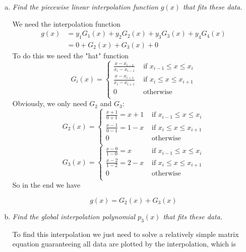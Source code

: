 \documentclass{article}
\begin{document}
\begin{enumerate}[(a)]
  \item \textit{Find the piecewise linear interpolation function $g(x)$ that fits these data.}

    We need the interpolation function
    \begin{align*}
      g(x) &= y_1G_1(x) + y_2G_2(x) + y_3G_3(x) + y_4G_4(x)\\
      &= 0 + G_2(x) + G_3(x) + 0
    \end{align*}
    To do this we need the "hat" function
    \[
      G_i(x) =
      \begin{cases}
        \frac{x-x_{i-1}}{x_i-x_{i-1}} &\text{ if } x_{i-1} \leq x \leq x_i \\
        \frac{x-x_{i+1}}{x_i - x_{i+1}} &\text{ if } x_i \leq x \leq x_{i+1} \\
        0 &\text{ otherwise } \\
      \end{cases}
    \]
    Obviously, we only need $G_2$ and $G_3$:
    \[
      G_2(x) =
      \begin{cases}
        \frac{x+1}{0 + 1} = x + 1&\text{ if } x_{i-1} \leq x \leq x_i \\
        \frac{x-1}{0 - 1} = 1 - x&\text{ if } x_i \leq x \leq x_{i+1} \\
        0 &\text{ otherwise } \\
      \end{cases}
    \]
    \[
      G_3(x) =
      \begin{cases}
        \frac{x-0}{1 - 0} = x &\text{ if } x_{i-1} \leq x \leq x_i \\
        \frac{x-2}{1 - 2} = 2 - x&\text{ if } x_i \leq x \leq x_{i+1} \\
        0 &\text{ otherwise } \\
      \end{cases}
    \]
    So in the end we have

    \[
      g(x) = G_2(x) + G_3(x)
    \]

        
  \item \textit{Find the global interpolation polynomial $p_3(x)$ that fits these data.}

    To find this interpolation we just need to solve a relatively simple matrix equation guaranteeing all data are plotted by the interpolation, which is


\end{enumerate}
\end{document}
